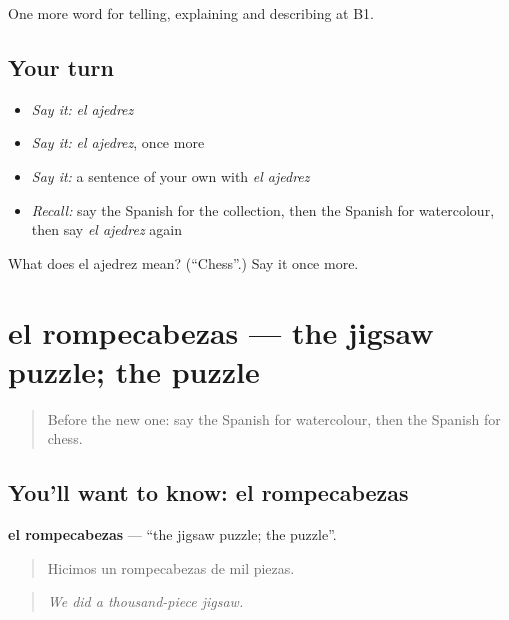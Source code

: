 \begin{grammarlens}[title={What you've built}]
One more word for telling, explaining and describing at B1.
\end{grammarlens}

\subsection*{Your turn}
\begin{itemize}
\raggedright
  \item \emph{Say it:} \emph{el ajedrez}
  \item \emph{Say it:} \emph{el ajedrez}, once more
  \item \emph{Say it:} a sentence of your own with \emph{el ajedrez}
  \item \emph{Recall:} say the Spanish for the collection, then the Spanish for watercolour, then say \emph{el ajedrez} again
\end{itemize}

\begin{tcolorbox}[breakable,colback=teal!4,colframe=teal!35!black,title={Before you move on}]
What does el ajedrez mean? (\textquotedblleft{}Chess\textquotedblright{}.) Say it once more.
\end{tcolorbox}
\section[el rompecabezas]{el rompecabezas — the jigsaw puzzle; the puzzle}

\label{lesson:ES-C752-rompecabezas}



\begin{quote}
Before the new one: say the Spanish for watercolour, then the Spanish for chess.
\end{quote}

\subsection*{You'll want to know: el rompecabezas}
\textbf{el rompecabezas} — \textquotedblleft{}the jigsaw puzzle; the puzzle\textquotedblright{}.

\begin{quote}
Hicimos un rompecabezas de mil piezas.
\end{quote}

\begin{quote}
\emph{We did a thousand-piece jigsaw.}
\end{quote}

